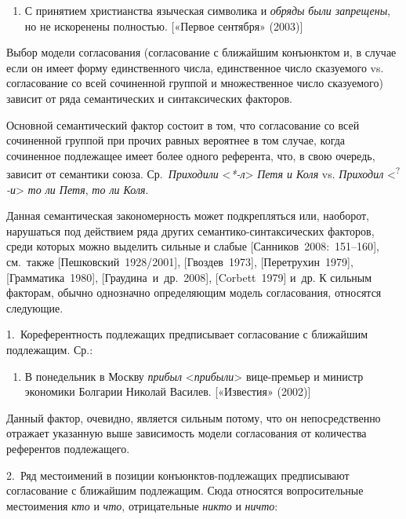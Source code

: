 \begin{enumerate}
\def\labelenumi{(\arabic{enumi})}
\setcounter{enumi}{84}
\item
  С принятием христианства языческая символика и \textit{обряды}
  \textit{были запрещены}, но не искоренены полностью. {[}«Первое
  сентября» (2003){]}
\end{enumerate}

Выбор модели согласования (согласование с ближайшим конъюнктом и, в
случае если он имеет форму единственного числа, единственное число
сказуемого vs. согласование со всей сочиненной группой и множественное
число сказуемого) зависит от ряда семантических и синтаксических
факторов.

Основной семантический фактор состоит в том, что согласование со всей
сочиненной группой при прочих равных вероятнее в том случае, когда
сочиненное подлежащее имеет более одного референта, что, в свою очередь,
зависит от семантики союза. Ср.~\textit{Приходили}
\textless{}\textit{*-л}\textgreater{} \textit{Петя и Коля} vs.
\textit{Приходил} \textless{}\textsuperscript{?}\textit{-и}\textgreater{}
\textit{то ли Петя}, \textit{то ли Коля}.

Данная семантическая закономерность может подкрепляться или, наоборот,
нарушаться под действием ряда других семантико-синтаксических факторов,
среди которых можно выделить сильные и слабые
{[}Санников~2008:~151--160{]}, см.~также {[}Пешковский~1928/2001{]},
{[}Гвоздев~1973{]}, {[}Перетрухин~1979{]}, {[}Грамматика~1980{]},
{[}Граудина~и~др.~2008{]}, {[}Corbett~1979{]} и~др. К сильным факторам,
обычно однозначно определяющим модель согласования, относятся следующие.

1.~Кореферентность подлежащих предписывает согласование с ближайшим
подлежащим. Ср.:

\begin{enumerate}
\def\labelenumi{(\arabic{enumi})}
\setcounter{enumi}{85}
\item
  В понедельник в Москву \textit{прибыл}
  \textless*\textit{прибыли}\textgreater{} вице-премьер и министр
  экономики Болгарии Николай Василев. {[}«Известия» (2002){]}
\end{enumerate}

Данный фактор, очевидно, является сильным потому, что он непосредственно
отражает указанную выше зависимость модели согласования от количества
референтов подлежащего.

2.~Ряд местоимений в позиции конъюнктов-подлежащих предписывают
согласование с ближайшим подлежащим. Сюда относятся вопросительные
местоимения \textit{кто} и \textit{что}, отрицательные \textit{никто} и
\textit{ничто}:

